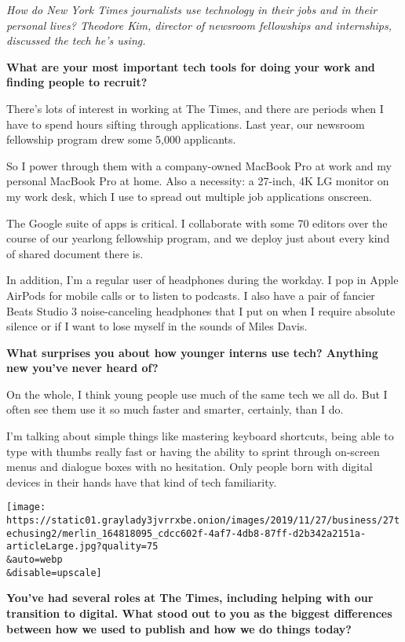 \emph{How do New York Times journalists use technology in their jobs and
in their personal lives? Theodore Kim, director of newsroom fellowships
and internships, discussed the tech he's using.}

\textbf{What are your most important tech tools for doing your work and
finding people to recruit?}

There's lots of interest in working at The Times, and there are periods
when I have to spend hours sifting through applications. Last year, our
newsroom fellowship program drew some 5,000 applicants.

So I power through them with a company-owned MacBook Pro at work and my
personal MacBook Pro at home. Also a necessity: a 27-inch, 4K LG monitor
on my work desk, which I use to spread out multiple job applications
onscreen.

The Google suite of apps is critical. I collaborate with some 70 editors
over the course of our yearlong fellowship program, and we deploy just
about every kind of shared document there is.

In addition, I'm a regular user of headphones during the workday. I pop
in Apple AirPods for mobile calls or to listen to podcasts. I also have
a pair of fancier Beats Studio 3 noise-canceling headphones that I put
on when I require absolute silence or if I want to lose myself in the
sounds of Miles Davis.

\textbf{What surprises you about how younger interns use tech? Anything
new you've never heard of?}

On the whole, I think young people use much of the same tech we all do.
But I often see them use it so much faster and smarter, certainly, than
I do.

I'm talking about simple things like mastering keyboard shortcuts, being
able to type with thumbs really fast or having the ability to sprint
through on-screen menus and dialogue boxes with no hesitation. Only
people born with digital devices in their hands have that kind of tech
familiarity.

\texttt{[image: https://static01.graylady3jvrrxbe.onion/images/2019/11/27/business/27techusing2/merlin\_164818095\_cdcc602f-4af7-4db8-87ff-d2b342a2151a-articleLarge.jpg?quality=75\\\&auto=webp\\\&disable=upscale]}

\textbf{You've had several roles at The Times, including helping with
our transition to digital. What stood out to you as the biggest
differences between how we used to publish and how we do things today?}

